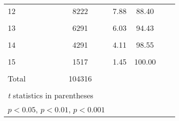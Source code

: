 {\begin{tabular}{l*{5}{c}}
12          &        8222    &7.88    &   88.40     \\
            &                     \\

13          &        6291  &6.03  &     94.43       \\
            &                     \\

14          &        4291  &  4.11  &     98.55     \\
            &                     \\

15          &        1517   & 1.45 &     100.00      \\
            &                     \\
\hline
Total       &      104316         \\
            &                     \\

\multicolumn{2}{l}{\footnotesize \textit{t} statistics in parentheses}\\
\multicolumn{2}{l}{\footnotesize \sym{*} \(p<0.05\), \sym{**} \(p<0.01\), \sym{***} \(p<0.001\)}\\
\end{tabular}
}
